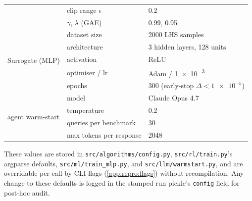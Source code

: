 \begin{table}[h]
\begin{tabular}{@{}l l l@{}}
      & clip range $\epsilon$               & \num{0.2} \\
      & $\gamma$, $\lambda$ (GAE)           & \num{0.99}, \num{0.95} \\
    \midrule
    \multirow{5}{*}{Surrogate (MLP)}
      & dataset size                        & \num{2000} LHS samples \\
      & architecture                        & \num{3} hidden layers, 128 units \\
      & activation                          & ReLU \\
      & optimiser / lr                      & Adam / \num{1e-3} \\
      & epochs                              & \num{300} (early-stop $\Delta<\num{1e-5}$) \\
    \midrule
    \multirow{4}{*}{agent warm-start}
      & model                               & Claude Opus 4.7 \\
      & temperature                         & \num{0.2} \\
      & queries per benchmark               & \num{30} \\
      & max tokens per response             & \num{2048} \\
    \bottomrule
  \end{tabular}
\end{table}

These values are stored in
\texttt{src/algorithms/config.py},
\texttt{src/rl/train.py}'s argparse defaults,
\texttt{src/ml/train\_mlp.py},
and \texttt{src/llm/warmstart.py}, and are overridable per-call
by CLI flags (\cref{app:repro:flags}) without recompilation.
Any change to these defaults is logged in the stamped run
pickle's \texttt{config} field for post-hoc audit.
